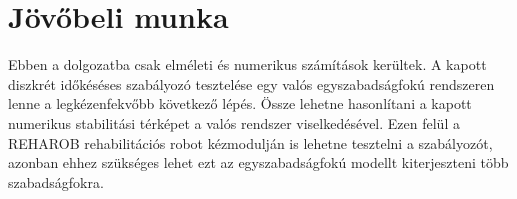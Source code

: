 \chapter{Jövőbeli munka}\label{chap:conclusion}

Ebben a dolgozatba csak elméleti és numerikus számítások kerültek. A kapott 
diszkrét időkéséses szabályozó tesztelése egy valós egyszabadságfokú rendszeren 
lenne a legkézenfekvőbb következő lépés. Össze lehetne hasonlítani a kapott 
numerikus stabilitási térképet a valós rendszer viselkedésével. Ezen felül 
a REHAROB rehabilitációs robot kézmodulján is lehetne tesztelni a szabályozót, azonban 
ehhez szükséges lehet ezt az egyszabadságfokú modellt kiterjeszteni több szabadságfokra.